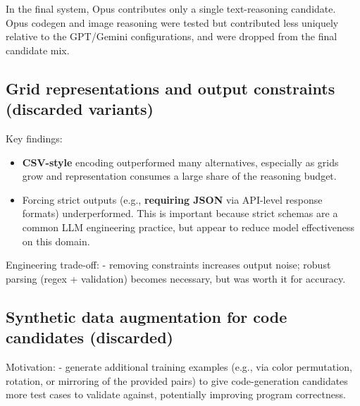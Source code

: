 \documentclass[11pt]{article}
\providecommand{\tightlist}{%
  \setlength{\itemsep}{0pt}\setlength{\parskip}{0pt}}
\begin{document}
In the final system, Opus contributes only a single text-reasoning
candidate. Opus codegen and image reasoning were tested but contributed
less uniquely relative to the GPT/Gemini configurations, and were
dropped from the final candidate mix.

\hypertarget{grid-representations-and-output-constraints-discarded-variants}{%
\subsection{Grid representations and output constraints (discarded
variants)}\label{grid-representations-and-output-constraints-discarded-variants}}

Key findings:

\begin{itemize}
\tightlist
\item
  \textbf{CSV-style} encoding outperformed many alternatives, especially
  as grids grow and representation consumes a large share of the
  reasoning budget.
\item
  Forcing strict outputs (e.g., \textbf{requiring JSON} via API-level
  response formats) underperformed. This is important because strict
  schemas are a common LLM engineering practice, but appear to reduce
  model effectiveness on this domain.
\end{itemize}

Engineering trade-off: - removing constraints increases output noise;
robust parsing (regex + validation) becomes necessary, but was worth it
for accuracy.

\hypertarget{synthetic-data-augmentation-for-code-candidates-discarded}{%
\subsection{Synthetic data augmentation for code candidates
(discarded)}\label{synthetic-data-augmentation-for-code-candidates-discarded}}

Motivation: - generate additional training examples (e.g., via color
permutation, rotation, or mirroring of the provided pairs) to give
code-generation candidates more test cases to validate against,
potentially improving program correctness.
\end{document}
